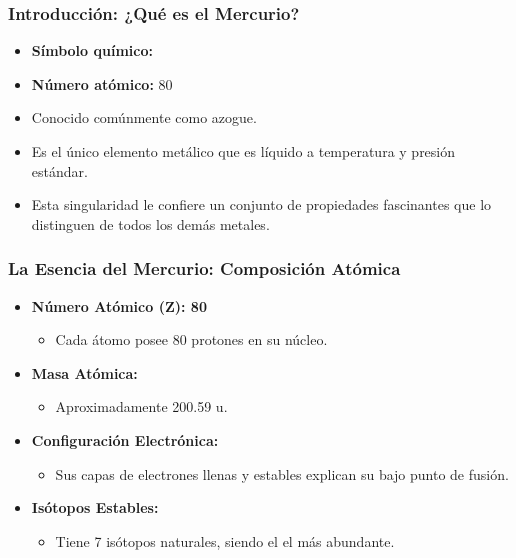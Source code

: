 \begin{frame}
  \frametitle{Introducción: ¿Qué es el Mercurio?}
  \begin{itemize}
    \item \textbf{Símbolo químico:} 
    \item \textbf{Número atómico:} 80
    \item Conocido comúnmente como azogue.
    \item Es el único elemento metálico que es líquido a temperatura y
      presión estándar.
    \item Esta singularidad le confiere un conjunto de propiedades
      fascinantes que lo distinguen de todos los demás metales.
  \end{itemize}
\end{frame}


\begin{frame}
  \frametitle{La Esencia del Mercurio: Composición Atómica}
  \begin{itemize}
    \item \textbf{Número Atómico (Z): 80}
      \begin{itemize}
        \item Cada átomo posee 80 protones en su núcleo.
      \end{itemize}
      \medskip
    \item \textbf{Masa Atómica:}
      \begin{itemize}
        \item Aproximadamente 200.59 u.
      \end{itemize}
      \medskip
    \item \textbf{Configuración Electrónica: }
      \begin{itemize}
        \item Sus capas de electrones llenas y estables explican su
          bajo punto de fusión.
      \end{itemize}
      \medskip
    \item \textbf{Isótopos Estables:}
      \begin{itemize}
        \item Tiene 7 isótopos naturales, siendo el  el
          más abundante.
      \end{itemize}
  \end{itemize}
\end{frame}


